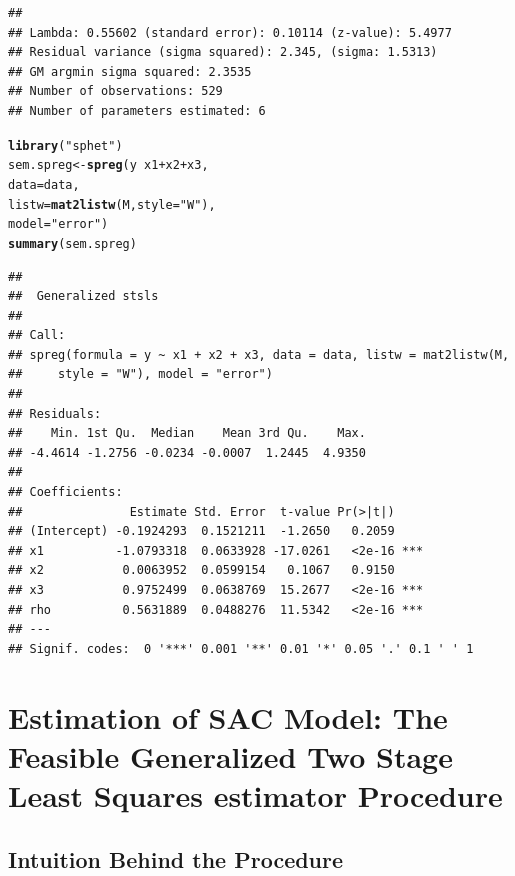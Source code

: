 \documentclass[english,12pt]{book}\usepackage[]{graphicx}\usepackage[]{xcolor}
\makeatletter
\newcommand{\hlstr}[1]{\textcolor[rgb]{0.192,0.494,0.8}{#1}}%
\newcommand{\hlopt}[1]{\textcolor[rgb]{0,0,0}{#1}}%
\newcommand{\hlstd}[1]{\textcolor[rgb]{0.345,0.345,0.345}{#1}}%
\newcommand{\hlkwb}[1]{\textcolor[rgb]{0.69,0.353,0.396}{#1}}%
\newcommand{\hlkwc}[1]{\textcolor[rgb]{0.333,0.667,0.333}{#1}}%
\newcommand{\hlkwd}[1]{\textcolor[rgb]{0.737,0.353,0.396}{\textbf{#1}}}%
\newenvironment{kframe}{%
 \def\at@end@of@kframe{}%
 \ifinner\ifhmode%
  \def\at@end@of@kframe{\end{minipage}}%
  \begin{minipage}{\columnwidth}%
 \fi\fi%
 \def\FrameCommand##1{\hskip\@totalleftmargin \hskip-\fboxsep
 \colorbox{shadecolor}{##1}\hskip-\fboxsep
     \hskip-\linewidth \hskip-\@totalleftmargin \hskip\columnwidth}%
 \MakeFramed {\advance\hsize-\width
   \@totalleftmargin\z@ \linewidth\hsize
   \@setminipage}}%
 {\par\unskip\endMakeFramed%
 \at@end@of@kframe}
\newenvironment{knitrout}{}{} %
\makeatother
\begin{document}
\begin{knitrout}
\begin{kframe}
\begin{verbatim}
## 
## Lambda: 0.55602 (standard error): 0.10114 (z-value): 5.4977
## Residual variance (sigma squared): 2.345, (sigma: 1.5313)
## GM argmin sigma squared: 2.3535
## Number of observations: 529 
## Number of parameters estimated: 6
\end{verbatim}
\begin{alltt}
\hlkwd{library}\hlstd{(}\hlstr{"sphet"}\hlstd{)}
\hlstd{sem.spreg}    \hlkwb{<-} \hlkwd{spreg}\hlstd{(y} \hlopt{~} \hlstd{x1} \hlopt{+} \hlstd{x2} \hlopt{+} \hlstd{x3,}
                        \hlkwc{data} \hlstd{= data,}
                        \hlkwc{listw} \hlstd{=} \hlkwd{mat2listw}\hlstd{(M,} \hlkwc{style} \hlstd{=} \hlstr{"W"}\hlstd{),}
                        \hlkwc{model} \hlstd{=} \hlstr{"error"}\hlstd{)}
\hlkwd{summary}\hlstd{(sem.spreg)}
\end{alltt}
\begin{verbatim}
## 
##  Generalized stsls
## 
## Call:
## spreg(formula = y ~ x1 + x2 + x3, data = data, listw = mat2listw(M, 
##     style = "W"), model = "error")
## 
## Residuals:
##    Min. 1st Qu.  Median    Mean 3rd Qu.    Max. 
## -4.4614 -1.2756 -0.0234 -0.0007  1.2445  4.9350 
## 
## Coefficients:
##               Estimate Std. Error  t-value Pr(>|t|)    
## (Intercept) -0.1924293  0.1521211  -1.2650   0.2059    
## x1          -1.0793318  0.0633928 -17.0261   <2e-16 ***
## x2           0.0063952  0.0599154   0.1067   0.9150    
## x3           0.9752499  0.0638769  15.2677   <2e-16 ***
## rho          0.5631889  0.0488276  11.5342   <2e-16 ***
## ---
## Signif. codes:  0 '***' 0.001 '**' 0.01 '*' 0.05 '.' 0.1 ' ' 1
\end{verbatim}
\end{kframe}
\end{knitrout}


\section{Estimation of SAC Model: The Feasible Generalized Two Stage Least Squares estimator Procedure}\label{sec:sfg2sls-sac}

\subsection{Intuition Behind the Procedure}
\end{document}
